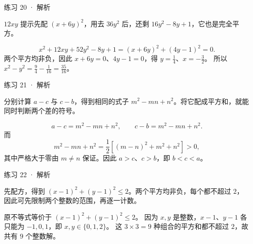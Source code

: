 


\begin{solution}[before skip=4pt plus 1pt,after skip=4pt plus 1pt,top=6pt,bottom=6pt]{练习 20 · 解析}

\think $12xy$ 提示先配 $(x+6y)^2$，用去 $36y^2$ 后，还剩 $16y^2-8y+1$，它也是完全平方。

\solve \[x^2+12xy+52y^2-8y+1=(x+6y)^2+(4y-1)^2=0.\]
两个平方均非负，因此 $x+6y=0$、$4y-1=0$，得 $y=\frac14$、$x=-\frac32$。
所以 $x^2-y^2=\frac94-\frac1{16}=\frac{35}{16}$。


\end{solution}


\begin{solution}[before skip=4pt plus 1pt,after skip=4pt plus 1pt,top=6pt,bottom=6pt]{练习 21 · 解析}

\think 分别计算 $a-c$ 与 $c-b$，得到相同的式子 $m^2-mn+n^2$。将它配成平方和，就能同时判断两个差的符号。

\solve \[a-c=m^2-mn+n^2,\qquad c-b=m^2-mn+n^2.\]
而
\[m^2-mn+n^2=\frac12[(m-n)^2+m^2+n^2]>0,\]
其中严格大于零由 $m\ne n$ 保证。因此 $a>c$、$c>b$，即 $b<c<a$。


\end{solution}


\begin{solution}[before skip=4pt plus 1pt,after skip=4pt plus 1pt,top=6pt,bottom=6pt]{练习 22 · 解析}

\think 先配方，得到 $(x-1)^2+(y-1)^2\le2$。两个平方均非负，每个都不超过 $2$，因此可先限制两个整数的范围，再逐一计数。

\solve 原不等式等价于 $(x-1)^2+(y-1)^2\le2$。
因为 $x,y$ 是整数，$x-1$、$y-1$ 各只能为 $-1,0,1$，即 $x,y\in\{0,1,2\}$。
这 $3\times3=9$ 种组合的平方和都不超过 $2$，故共有 $9$ 个整数解。


\end{solution}


